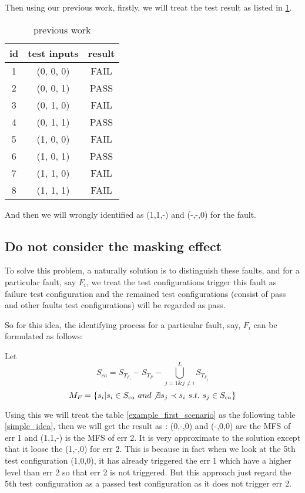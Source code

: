 \documentclass{sig-alternate}
\begin{document}
Then using our previous work, firstly, we will treat the test result as listed in \ref{previous_work}.

\begin{table}
\centering
\caption{previous work}
\label{previous_work}
\begin{tabular}{|c|c|c|} \hline
id&test inputs & result\\ \hline
1&(0, 0, 0) &  FAIL\\ \hline
2&(0, 0, 1) &  PASS\\ \hline
3&(0, 1, 0) &  FAIL\\ \hline
4&(0, 1, 1) &  PASS\\ \hline
5&(1, 0, 0) &  FAIL\\ \hline
6&(1, 0, 1) &  PASS\\ \hline
7&(1, 1, 0) &  FAIL\\ \hline
8&(1, 1, 1) &  FAIL\\ \hline
\hline\end{tabular}
\end{table}

And then we will wrongly identified as (1,1,-) and (-,-,0) for the fault.

\subsection{Do not consider the masking effect}

To solve this problem, a naturally solution is to distinguish these faults, and for a particular fault, say $F_{i}$, we treat the test configurations trigger this fault as failure test configuration and the remained test configurations (consist of pass and other faults test configurations) will be regarded as pass.

So for this idea, the identifying process for a particular fault, say, $F_{i}$ can be formulated as follows:

Let $$S_{ca} = S_{T_{F_{i}}} - S_{T_{P}} - \bigcup_{j = 1 \& j \neq i }^{L}S_{T_{F_{j}}}$$
$$M_{F} = \{s_{i} | s_{i} \in S_{ca}\ and \not\exists s_{j} \prec s_{i}\ s.t.\ s_{j} \in S_{ca} \}$$

Using this we will treat the table \ref{example_first_scenario} as the following table \ref{simple_idea}, then we will get the result as : (0,-,0) and (-,0,0) are the MFS of err 1 and (1,1,-) is the MFS of err 2. It is very approximate to the solution except that it loose the (1,-,0) for err 2. This is because in fact when we look at the 5th test configuration (1,0,0), it has already triggered the err 1 which have a higher level than err 2 so that err 2 is not triggered. But this approach just regard the 5th test configuration as a passed test configuration as it does not trigger err 2.
\end{document}
